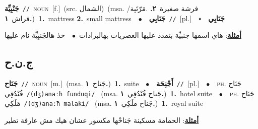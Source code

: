 \documentclass[10pt,a4paper,twoside]{article} %
\begin{document}
\begin{multicols}{2}
{\setlength\topsep{0pt}\textbf{\foreignlanguage{arabic}{جَنْبِيِّة}}\ {\color{gray}\texttt{//}\color{black}}\ \textsc{noun}\ [f.]\ (src. \color{gray}\foreignlanguage{arabic}{الشمال}\color{black})\ \color{gray}(msa. \foreignlanguage{arabic}{فرشة صغيرة}~\foreignlanguage{arabic}{\textbf{٢.}}  .\foreignlanguage{arabic}{مَرّتَبِة/ فراش}~\foreignlanguage{arabic}{\textbf{١.}})\color{black}\ \textbf{1.}~mattress  \textbf{2.}~small mattress\ \ $\bullet$\ \ \setlength\topsep{0pt}\textbf{\foreignlanguage{arabic}{جَنَابِي}}\ {\color{gray}\texttt{//}\color{black}}\ [pl.]\ \ $\smblkdiamond$\ \ \setlength\topsep{0pt}\textbf{\foreignlanguage{arabic}{جَنَابِي}}\  \begin{flushright}\color{gray}\foreignlanguage{arabic}{\textbf{\underline{\foreignlanguage{arabic}{أمثلة}}}: هاي اسمها جنبيِّة بتمدد عليها العصريات بهالبرادات\ $\bullet$\ \  خذ هالجَنبِيِّة نام عليها}\end{flushright}\color{black}} \vspace{2mm}

\vspace{-3mm}
\subsection*{\color{blue}\foreignlanguage{arabic}{ج.ن.ح}\color{blue}{}} 

{\setlength\topsep{0pt}\textbf{\foreignlanguage{arabic}{جَنَاح}}\ {\color{gray}\texttt{//}\color{black}}\ \textsc{noun}\ [m.]\ \color{gray}(msa. \foreignlanguage{arabic}{جَناح}~\foreignlanguage{arabic}{\textbf{١.}})\color{black}\ \textbf{1.}~suite\ \ $\bullet$\ \ \setlength\topsep{0pt}\textbf{\foreignlanguage{arabic}{أَجْنِحَة}}\ {\color{gray}\texttt{//}\color{black}}\ [pl.]\ \ $\bullet$\ \ \textsc{ph.} \color{gray} \foreignlanguage{arabic}{جَنَاح فُنْدُقِي}\color{black}\ {\color{gray}\texttt{/{\sffamily (dʒ)anaːħ funduqi}/}\color{black}}\ \color{gray} (msa. \foreignlanguage{arabic}{جَناح فُنْدُقِي}~\foreignlanguage{arabic}{\textbf{١.}})\color{black}\ \textbf{1.}~hotel suite\ \ $\bullet$\ \ \textsc{ph.} \color{gray} \foreignlanguage{arabic}{جَنَاح مَلَكِي}\color{black}\ {\color{gray}\texttt{/{\sffamily (dʒ)anaːħ malaki}/}\color{black}}\ \color{gray} (msa. \foreignlanguage{arabic}{جَناح ملَكِي}~\foreignlanguage{arabic}{\textbf{١.}})\color{black}\ \textbf{1.}~royal suite\  \begin{flushright}\color{gray}\foreignlanguage{arabic}{\textbf{\underline{\foreignlanguage{arabic}{أمثلة}}}: الحمامة مسكينة جَناحْها مكسور عشان هيك مش عارفة تطير}\end{flushright}\color{black}} \vspace{2mm}


\end{multicols}
\end{document}
